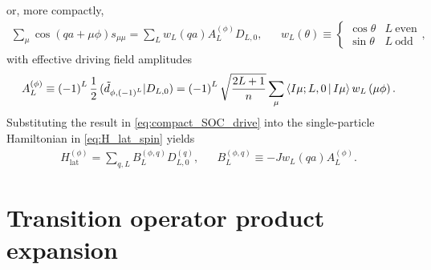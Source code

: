 \documentclass[nofootinbib,notitlepage,11pt]{revtex4-2}
\renewcommand{\t}{\text} %
\newcommand{\f}[2]{\dfrac{#1}{#2}} %
\newcommand{\p}[1]{\left(#1\right)} %
\newcommand{\bk}{\Braket} %
\newcommand{\1}{\mathds{1}}
\def\obk#1{\mathinner{({#1})}}
\begin{document}
or, more compactly,
\begin{align}
  \sum_\mu \cos\p{qa+\mu\phi} s_{\mu\mu}
  = \sum_L w_L\p{qa} A_L^{(\phi)} D_{L,0},
  &&
  w_L\p{\theta} \equiv
  \begin{cases}
    \cos\theta & L~\t{even} \\
    \sin\theta & L~\t{odd}
  \end{cases},
  \label{eq:compact_SOC_drive}
\end{align}
with effective driving field amplitudes
\begin{align}
  A_L^{(\phi)}
  \equiv \p{-1}^L \f12 \obk{\tilde d_{\phi,\p{-1}^L}|D_{L,0}}
  = \p{-1}^L \sqrt{\f{2L+1}{n}}
  \sum_\mu \bk{I\mu;L,0|I\mu} w_L\p{\mu\phi}.
\end{align}
Substituting the result in \eqref{eq:compact_SOC_drive} into the
single-particle Hamiltonian in \eqref{eq:H_lat_spin} yields
\begin{align}
  H_{\t{lat}}^{(\phi)} = \sum_{q,L} B_L^{(\phi,q)} D_{L,0}^{(q)},
  &&
  B_L^{(\phi,q)} \equiv -J w_L\p{qa} A_L^{(\phi)}.
\end{align}

\section{Transition operator product expansion}
\label{sec:trans_prod}
\end{document}

